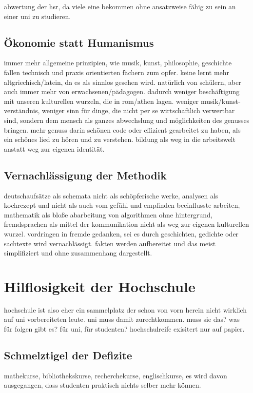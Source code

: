 \documentclass[a4paper,10pt,twoside,titlepage]{article}
\begin{document}
abwertung der hsr, da viele eine bekommen ohne ansatzweise fähig zu sein an einer uni zu studieren. 

\subsection{Ökonomie statt Humanismus}
immer mehr allgemeine prinzipien, wie musik, kunst, philosophie, geschichte fallen technisch und praxis orientierten fächern zum opfer. keine lernt mehr altgriechisch/latein, da es als sinnlos gesehen wird. natürlich von schülern, aber auch immer mehr von erwachsenen/pädagogen. dadurch weniger beschäftigung mit unseren kulturellen wurzeln, die in rom/athen lagen. weniger musik/kunst-verständnis, weniger sinn für dinge, die nicht per se wirtschaftlich verwertbar sind, sondern dem mensch als ganzes abwechslung und möglichkeiten des genusses bringen. mehr genuss darin schönen code oder effizient gearbeitet zu haben, als ein schönes lied zu hören und zu verstehen. bildung als weg in die arbeitswelt anstatt weg zur eigenen identität.


\subsection{Vernachlässigung der Methodik}
deutschaufsätze als schemata nicht als schöpferische werke, analysen als kochrezept und nicht als auch vom gefühl und empfinden beeinflusste arbeiten, mathematik als bloße abarbeitung von algorithmen ohne hintergrund, fremdsprachen als mittel der kommunikation nicht als weg zur eigenen kulturellen wurzel. vordringen in fremde gedanken, sei es durch geschichten, gedichte oder sachtexte wird vernachlässigt. fakten werden aufbereitet und das meist simplifiziert und ohne zusammenhang dargestellt. 

\section{Hilflosigkeit der Hochschule}
hochschule ist also eher ein sammelplatz der schon von vorn herein nicht wirklich auf uni vorbereiteten leute. uni muss damit zurechtkommen. muss sie das? was für folgen gibt es? für uni, für studenten? hochschulreife exisitert nur auf papier.

\subsection{Schmelztigel der Defizite}
mathekurse, bibliothekskurse, recherchekurse, englischkurse, es wird davon ausgegangen, dass studenten praktisch nichts selber mehr können.
\end{document}
